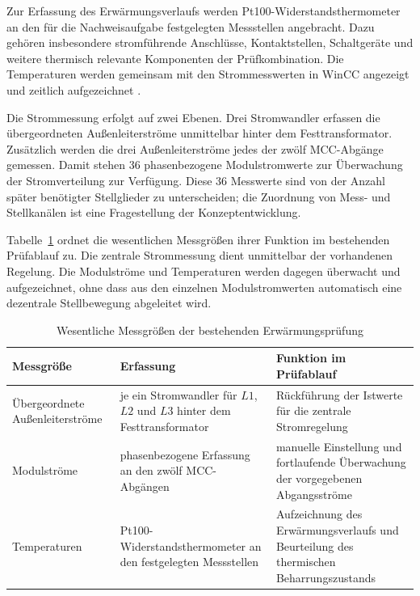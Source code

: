 Zur Erfassung des Erwärmungsverlaufs werden Pt100-Widerstandsthermometer an
den für die Nachweisaufgabe festgelegten Messstellen angebracht. Dazu gehören
insbesondere stromführende Anschlüsse, Kontaktstellen, Schaltgeräte und
weitere thermisch relevante Komponenten der Prüfkombination. Die
Temperaturen werden gemeinsam mit den Strommesswerten in WinCC angezeigt und
zeitlich aufgezeichnet
\parencite[Bestandsaufnahme: Messwerterfassung und
Prüfablauf]{rj_pruefstand_2026}.

Die Strommessung erfolgt auf zwei Ebenen. Drei Stromwandler erfassen die
übergeordneten Außenleiterströme unmittelbar hinter dem Festtransformator.
Zusätzlich werden die drei Außenleiterströme jedes der zwölf MCC-Abgänge
gemessen. Damit stehen 36 phasenbezogene Modulstromwerte zur Überwachung der
Stromverteilung zur Verfügung. Diese 36 Messwerte sind von der Anzahl später
benötigter Stellglieder zu unterscheiden; die Zuordnung von Mess- und
Stellkanälen ist eine Fragestellung der Konzeptentwicklung.

Tabelle~\ref{tab:ist_messgroessen_pruefablauf} ordnet die wesentlichen
Messgrößen ihrer Funktion im bestehenden Prüfablauf zu. Die zentrale
Strommessung dient unmittelbar der vorhandenen Regelung. Die Modulströme und
Temperaturen werden dagegen überwacht und aufgezeichnet, ohne dass aus den
einzelnen Modulstromwerten automatisch eine dezentrale Stellbewegung
abgeleitet wird.

\begin{table}[H]
    \centering
    \caption{Wesentliche Messgrößen der bestehenden
    Erwärmungsprüfung}
    \label{tab:ist_messgroessen_pruefablauf}
    \begin{tabular}{p{}p{}p{}}
        \toprule
        Messgröße & Erfassung & Funktion im Prüfablauf \\
        \midrule
        Übergeordnete Außenleiterströme &
        je ein Stromwandler für \(L1\), \(L2\) und \(L3\) hinter dem
        Festtransformator &
        Rückführung der Istwerte für die zentrale Stromregelung \\
        \addlinespace
        Modulströme &
        phasenbezogene Erfassung an den zwölf MCC-Abgängen &
        manuelle Einstellung und fortlaufende Überwachung der
        vorgegebenen Abgangsströme \\
        \addlinespace
        Temperaturen &
        Pt100-Widerstandsthermometer an den festgelegten Messstellen &
        Aufzeichnung des Erwärmungsverlaufs und Beurteilung des
        thermischen Beharrungszustands \\
        \bottomrule
    \end{tabular}
\end{table}

